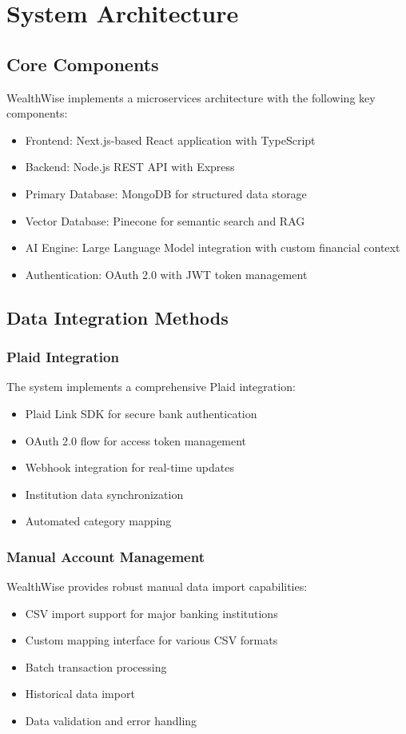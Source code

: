 \documentclass[conference]{IEEEtran}
\begin{document}
\section{System Architecture}
\subsection{Core Components}
WealthWise implements a microservices architecture with the following key components:
\begin{itemize}
\item Frontend: Next.js-based React application with TypeScript
\item Backend: Node.js REST API with Express
\item Primary Database: MongoDB for structured data storage
\item Vector Database: Pinecone for semantic search and RAG
\item AI Engine: Large Language Model integration with custom financial context
\item Authentication: OAuth 2.0 with JWT token management
\end{itemize}

\subsection{Data Integration Methods}
\subsubsection{Plaid Integration}
The system implements a comprehensive Plaid integration:
\begin{itemize}
\item Plaid Link SDK for secure bank authentication
\item OAuth 2.0 flow for access token management
\item Webhook integration for real-time updates
\item Institution data synchronization
\item Automated category mapping
\end{itemize}

\subsubsection{Manual Account Management}
WealthWise provides robust manual data import capabilities:
\begin{itemize}
\item CSV import support for major banking institutions
\item Custom mapping interface for various CSV formats
\item Batch transaction processing
\item Historical data import
\item Data validation and error handling
\end{itemize}
\end{document}
